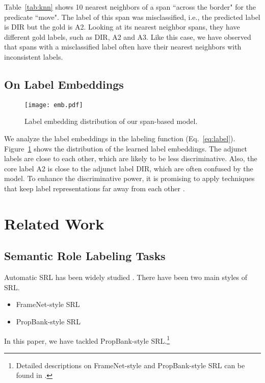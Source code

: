 \documentclass[11pt,a4paper]{article}
\begin{document}
Table~\ref{tab:knn} shows 10 nearest neighbors of a span ``across the border" for the predicate ``move".
The label of this span was misclassified, i.e., the predicted label is DIR but the gold is A2.
Looking at its nearest neighbor spans, they have different gold labels, such as DIR, A2 and A3.
Like this case, we have observed that spans with a misclassified label often have their nearest neighbors with inconsistent labels.

\subsection*{On Label Embeddings}
\begin{figure}[t]
  \begin{center}
    \texttt{[image: emb.pdf]}
  \end{center}
  \vspace{-0.8cm}
  \caption{\label{fig:label-emb} Label embedding distribution of our span-based model.}
\end{figure}

\noindent
We analyze the label embeddings in the labeling function (Eq.~\ref{eq:label}).
Figure~\ref{fig:label-emb} shows the distribution of the learned label embeddings.
The adjunct labels are close to each other, which are likely to be less discriminative.
Also, the core label A2 is close to the adjunct label DIR, which are often confused by the model.
To enhance the discriminative power, it is promising to apply techniques that keep label representations far away from each other \cite{wen:16,luo:17}.

\section{Related Work}
\label{sec:rwork}
\subsection{Semantic Role Labeling Tasks}

Automatic SRL has been widely studied \cite{gildea:02}.
There have been two main styles of SRL.
\begin{itemize}
\setlength{\parskip}{0cm} 
\setlength{\itemsep}{0cm} 
\item FrameNet-style SRL \cite{baker:98}
\item PropBank-style SRL \cite{palmer:05}
\end{itemize}

\noindent
In this paper, we have tackled PropBank-style SRL.\footnote{Detailed descriptions on FrameNet-style and PropBank-style SRL can be found in .}
\end{document}
